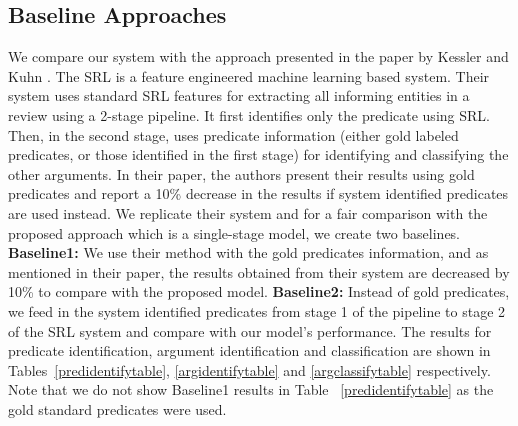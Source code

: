 \subsection{Baseline Approaches}
We compare our system with the approach presented in the paper by Kessler and Kuhn \cite{kessler2013detection}. The SRL is a feature engineered machine learning based system. Their system uses standard SRL features for extracting all informing entities in a review using a 2-stage pipeline. It first identifies only the predicate using SRL. Then, in the second stage, uses predicate information (either gold labeled predicates, or those identified in the first stage) for identifying and classifying the other arguments. In their paper, the authors present their results using gold predicates and report a 10\% decrease in the results if system identified predicates are used instead. We replicate their system and for a fair comparison with the proposed approach which is a single-stage model, we create two baselines. \textbf{Baseline1:} We use their method with the gold predicates information, and as mentioned in their paper, the results obtained from their system are decreased by 10\% to compare with the proposed model. \textbf{Baseline2:} Instead of gold predicates, we feed in the system identified predicates from stage 1 of the pipeline to stage 2 of the SRL system and compare with our model's performance. The results for predicate identification, argument identification and classification are shown in Tables~\ref{predidentifytable}, \ref{argidentifytable} and \ref{argclassifytable} respectively. Note that we do not show Baseline1 results in Table ~\ref{predidentifytable} as the gold standard predicates were used.

